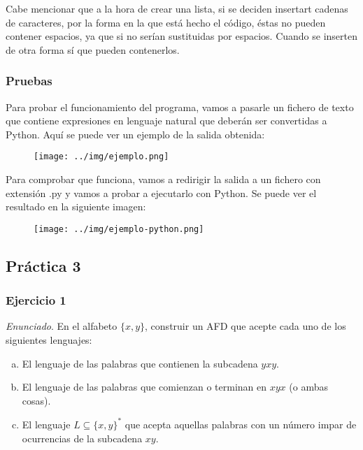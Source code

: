\documentclass[11pt,a4paper]{article}
\newcommand{\enu}{\textit{Enunciado}}
\begin{document}
		Cabe mencionar que a la hora de crear una lista, si se deciden insertart cadenas de caracteres, por la forma
		en la que está hecho el código, éstas no pueden contener espacios, ya que si no serían sustituidas por espacios.
		Cuando se inserten de otra forma sí que pueden contenerlos.
		
		\subsubsection{Pruebas}
		Para probar el funcionamiento del programa, vamos a pasarle un fichero de texto que contiene expresiones en
		lenguaje natural que deberán ser convertidas a Python. Aquí se puede ver un ejemplo de la salida obtenida:
		
		\begin{figure}[H]
			\centering
			\texttt{[image: ../img/ejemplo.png]}
		\end{figure}
		
		Para comprobar que funciona, vamos a redirigir la salida a un fichero con extensión .py y vamos a probar
		a ejecutarlo con Python. Se puede ver el resultado en la siguiente imagen:
		
		\begin{figure}[H]
			\centering
			\texttt{[image: ../img/ejemplo-python.png]}
		\end{figure}
		
	\newpage
	\subsection{Práctica 3}
	
		\subsubsection{Ejercicio 1}
		\enu. En el alfabeto $\lbrace x, y \rbrace$, construir un AFD que acepte cada uno de los siguientes 
		lenguajes:
		
		\begin{enumerate}[a)]
			\item El lenguaje de las palabras que contienen la subcadena $yxy$.
			\item El lenguaje de las palabras que comienzan o terminan en $xyx$ (o ambas cosas).
			\item El lenguaje $L \subseteq \lbrace x, y \rbrace ^*$ que acepta aquellas palabras con un número impar
			de ocurrencias de la subcadena $xy$.
		\end{enumerate}
		
\end{document}
